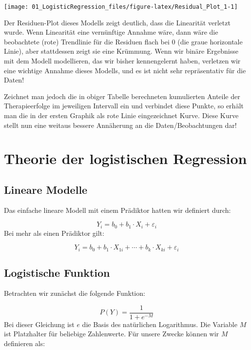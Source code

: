 \documentclass[
]{article}
\begin{document}
\begin{center}\texttt{[image: 01\_LogisticRegression\_files/figure-latex/Residual\_Plot\_1-1]} \end{center}

Der Residuen-Plot dieses Modells zeigt deutlich, dass die Linearität verletzt wurde. Wenn Linearität eine vernünftige Annahme wäre, dann wäre die beobachtete (rote) Trendlinie für die Residuen flach bei 0 (die graue horizontale Linie), aber stattdessen zeigt sie eine Krümmung. Wenn wir binäre Ergebnisse mit dem Modell modellieren, das wir bisher kennengelernt haben, verletzen wir eine wichtige Annahme dieses Modells, und es ist nicht sehr repräsentativ für die Daten!

Zeichnet man jedoch die in obiger Tabelle berechneten kumulierten Anteile der Therapieerfolge im jeweiligen Intervall ein und verbindet diese Punkte, so erhält man die in der ersten Graphik als rote Linie eingezeichnet Kurve. Diese Kurve stellt nun eine weitaus bessere Annäherung an die Daten/Beobachtungen dar!

\section{Theorie der logistischen Regression}\label{theorie-der-logistischen-regression}

\subsection{Lineare Modelle}\label{lineare-modelle}

Das einfache lineare Modell mit einem Prädiktor hatten wir definiert durch:

\[Y_i = b_0 + b_1 \cdot X_i + \varepsilon_i\]
Bei mehr als einen Prädiktor gilt:

\[Y_i = b_0 + b_1 \cdot X_{1i} + \cdots + b_k \cdot X_{ki} + \varepsilon_i\]

\subsection{Logistische Funktion}\label{logistische-funktion}

Betrachten wir zunächst die folgende Funktion:

\[P(Y) = \frac{1}{1 + e^{-M}}\]
Bei dieser Gleichung ist \(e\) die Basis des natürlichen Logarithmus. Die Variable \(M\) ist Platzhalter für beliebige Zahlenwerte. Für unsere Zwecke können wir \(M\) definieren als:
\end{document}
